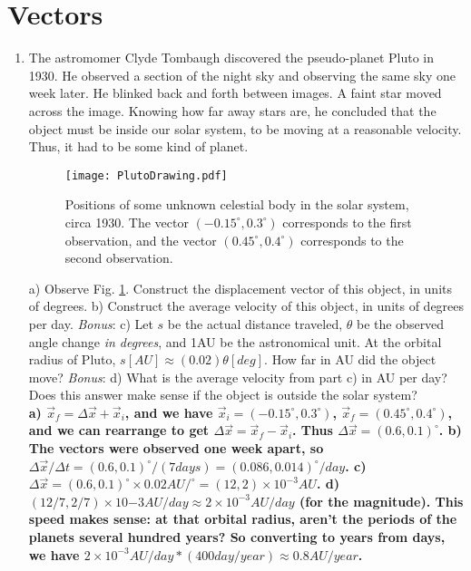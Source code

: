 \documentclass[10pt]{article}
\begin{document}
\section{Vectors}
\begin{enumerate}
\item The astromomer Clyde Tombaugh discovered the pseudo-planet Pluto in 1930.  He observed a section of the night sky and observing the same sky one week later.  He blinked back and forth between images.  A faint star moved across the image.  Knowing how far away stars are, he concluded that the object must be inside our solar system, to be moving at a reasonable velocity.  Thus, it had to be some kind of planet.
\begin{figure}
\centering
\texttt{[image: PlutoDrawing.pdf]}
\caption{\label{fig:1} Positions of some unknown celestial body in the solar system, circa 1930.  The vector $(-0.15^{\circ},0.3^{\circ})$ corresponds to the first observation, and the vector $(0.45^{\circ},0.4^{\circ})$ corresponds to the second observation.}
\end{figure}
a) Observe Fig. \ref{fig:1}.  Construct the displacement vector of this object, in units of degrees.  b) Construct the average velocity of this object, in units of degrees per day.  \textit{Bonus}: c) Let $s$ be the actual distance traveled, $\theta$ be the observed angle change \textit{in degrees}, and 1AU be the astronomical unit.  At the orbital radius of Pluto, $s[AU] \approx (0.02) \theta[deg]$.  How far in AU did the object move?  \textit{Bonus}: d) What is the average velocity from part c) in AU per day?  Does this answer make sense if the object is outside the solar system?
\vspace{0.5 cm} \\
\textbf{a) $\vec{x}_f = \Delta \vec{x} + \vec{x}_i$, and we have $\vec{x}_i = (-0.15^{\circ},0.3^{\circ})$, $\vec{x}_f = (0.45^{\circ},0.4^{\circ})$, and we can rearrange to get $\Delta \vec{x} = \vec{x}_f - \vec{x}_i$.  Thus $\Delta\vec{x} = (0.6,0.1)^{\circ}$. b) The vectors were observed one week apart, so $\Delta\vec{x}/\Delta t = (0.6,0.1)^{\circ}/(7 days) = (0.086,0.014)^{\circ}/day$.  c) $\Delta \vec{x} = (0.6,0.1)^{\circ} \times 0.02 AU/^{\circ} = (12,2) \times 10^{-3} AU$.  d) $(12/7,2/7) \times 10{-3} AU/day \approx 2 \times 10^{-3} AU/day$ (for the magnitude).  This speed makes sense: at that orbital radius, aren't the periods of the planets several hundred years?  So converting to years from days, we have $2 \times 10^{-3} AU/day * (400 day/year) \approx 0.8 AU/year$.}
\vspace{0.4 cm}
\end{enumerate}
\end{document}
